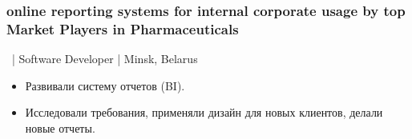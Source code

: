 \documentclass{article}
\begin{document}
\begin{minipage}[t]{0.6\textwidth}
	\subsubsection*{online reporting systems for internal corporate usage by top Market Players in Pharmaceuticals}
    \ | Software Developer | Minsk, Belarus
    \begin{itemize}
      \item Развивали систему отчетов (BI). 
      \item Исследовали требования, применяли дизайн для новых клиентов, делали новые отчеты.
    \end{itemize}

  \end{minipage}
\end{document}
